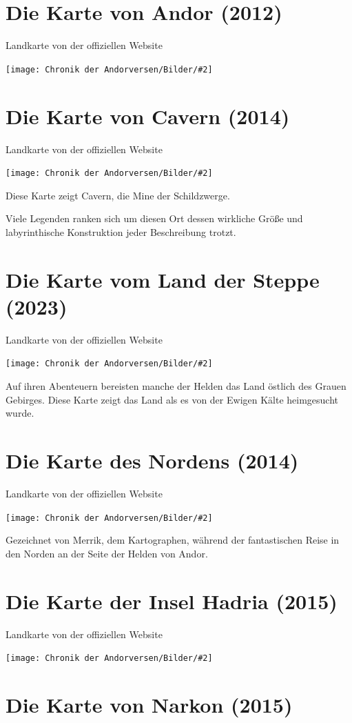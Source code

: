\documentclass[10pt, a4paper, oneside]{book}
\newcommand{\produkt}[1]{%
    \section{#1}%
    \label{Produkt: #1}%
}
\newcommand{\bildmitts}[2][height=0.32\textwidth,width=0.48\textwidth,keepaspectratio]{%
    \begin{center}
        \texttt{[image: Chronik der Andorversen/Bilder/\#2]}
    \end{center}
}
\begin{document}
\produkt{Die Karte von Andor (2012)}

\begin{center}
    Landkarte von der offiziellen Website
\end{center}

\bildmitts[width=\textwidth]{Die Karte von Andor.jpg}


\newpage
\produkt{Die Karte von Cavern (2014)}

\begin{center}
    Landkarte von der offiziellen Website
\end{center}

\bildmitts[width=\textwidth]{Die Karte von Cavern.jpg}

Diese Karte zeigt Cavern, die Mine der Schildzwerge.

Viele Legenden ranken sich um diesen Ort dessen wirkliche Größe und labyrinthische Konstruktion jeder Beschreibung trotzt.


\newpage
\produkt{Die Karte vom Land der Steppe (2023)}

\begin{center}
    Landkarte von der offiziellen Website
\end{center}

\bildmitts[width=\textwidth]{Die Karte vom Land der Steppe.jpg}


Auf ihren Abenteuern bereisten manche der Helden das Land östlich des Grauen Gebirges. Diese Karte zeigt das Land als es von der Ewigen Kälte heimgesucht wurde.


\newpage
\produkt{Die Karte des Nordens (2014)}

\begin{center}
    Landkarte von der offiziellen Website
\end{center}

\bildmitts[width=\textwidth]{Die Karte des Nordens.jpg}

Gezeichnet von Merrik, dem Kartographen, während der fantastischen Reise in den Norden an der Seite der Helden von Andor.


\newpage
\produkt{Die Karte der Insel Hadria (2015)}

\begin{center}
    Landkarte von der offiziellen Website
\end{center}

\bildmitts[width=\textwidth]{Die Karte der Insel Hadria.jpg}



\newpage
\produkt{Die Karte von Narkon (2015)}
\end{document}
